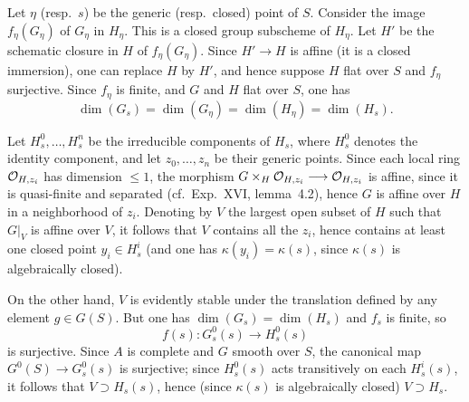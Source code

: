 \label{XXV.4.3}
Let $\eta$ (resp.~$s$) be the generic (resp.~closed) point of $S$. Consider the image $f_\eta(G_\eta)$ of $G_\eta$ in $H_\eta$. This is a closed group subscheme of $H_\eta$. Let $H'$ be the schematic closure in $H$ of $f_\eta(G_\eta)$. Since $H'\to H$ is affine (it is a closed immersion), one can replace $H$ by $H'$, and hence suppose $H$ flat over $S$ and $f_\eta$ surjective. Since $f_\eta$ is finite, and $G$ and $H$ flat over $S$, one has
\[
\dim(G_s)=\dim(G_\eta)=\dim(H_\eta)=\dim(H_s).
\]

\label{XXV.4.4}
Let $H_s^0,\ldots,H_s^n$ be the irreducible components of $H_s$, where $H_s^0$ denotes the identity component, and let $z_0,\ldots,z_n$ be their generic points. Since each local ring $\mathcal{O}_{H,z_i}$ has dimension $\le1$, the morphism $G\times_H\mathcal{O}_{H,z_i}\longrightarrow\mathcal{O}_{H,z_i}$ is affine, since it is quasi-finite and separated (cf.~Exp.~XVI, lemma~4.2), hence $G$ is affine over $H$ in a neighborhood of $z_i$. Denoting by $V$ the largest open subset of $H$ such that $G|_V$ is affine over $V$, it follows that $V$ contains all the $z_i$, hence contains at least one closed point $y_i\in H_s^i$ (and one has $\kappa(y_i)=\kappa(s)$, since $\kappa(s)$ is algebraically closed).

On the other hand, $V$ is evidently stable under the translation defined by any element $g\in G(S)$. But one has $\dim(G_s)=\dim(H_s)$ and $f_s$ is finite, so
\[
f(s):G_s^0(s)\to H_s^0(s)
\]
is surjective. Since $A$ is complete and $G$ smooth over $S$, the canonical map $G^0(S)\to G_s^0(s)$ is surjective; since $H_s^0(s)$ acts transitively on each $H_s^i(s)$, it follows that $V\supset H_s(s)$, hence (since $\kappa(s)$ is algebraically closed) $V\supset H_s$.

